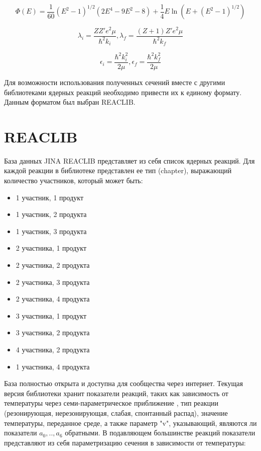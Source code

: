 \documentclass[%
master,    %
natbib,      %
subf,        %
href,        %
colorlinks,  %
]{disser}
\begin{document}
\begin{equation}
\label{eq:phi}
\Phi(E) = \frac{1}{60}(E^2-1)^{1/2}(2E^4-9E^2-8)+\frac{1}{4}E\ln(E+(E^2-1)^{1/2})
\end{equation}

\begin{equation}
\label{eq:lambda}
	\lambda_i = \frac{ZZ'e^2\mu}{\hbar^2 k_i}, \lambda_f = \frac{(Z+1)Z'e^2\mu}{\hbar^2 k_f}
\end{equation}

\begin{equation}
\label{eq:epsilon}
\epsilon_i = \frac{\hbar^2 k_i^2}{2\mu}, \epsilon_f = \frac{\hbar^2 k_f^2}{2\mu}
\end{equation}

Для возможности использования полученных сечений вместе с другими библиотеками ядерных реакций необходимо привести их к единому формату. Данным форматом был выбран REACLIB.

\section{REACLIB}

База данных JINA REACLIB представляет из себя список ядерных реакций. Для каждой реакции в библиотеке представлен ее тип (chapter), выражающий количество участников, который может быть:
\begin{itemize}
	\item 1 участник, 1 продукт
	\item 1 участник, 2 продукта
	\item 1 участник, 3 продукта
	\item 2 участника, 1 продукт
	\item 2 участника, 2 продукта
	\item 2 участника, 3 продукта
	\item 2 участника, 4 продукта
	\item 3 участника, 1 продукт
	\item 3 участника, 2 продукта
	\item 4 участника, 2 продукта
	\item 1 участника, 4 продукта
\end{itemize}
 База полностью открыта и доступна для сообщества через интернет. Текущая версия библиотеки хранит показатели реакций, таких как зависимость от температуры через семи-параметрическое приближение \cite{jina}, тип реакции (резонирующая, нерезонирующая, слабая, спонтанный распад), значение температуры, переданное среде, а также параметр "v", указывающий, являются ли показатели $a_0, .., a_6$ обратными. В подавляющем большинстве реакций показатели представляют из себя параметризацию сечения в зависимости от температуры:
\end{document}
